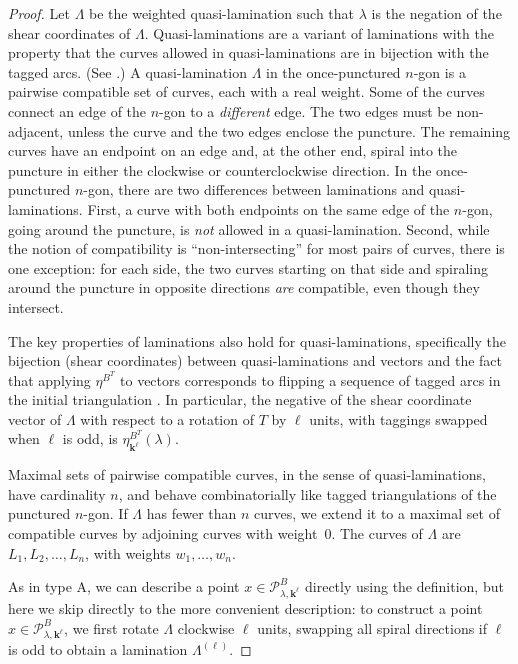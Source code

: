 \documentclass{amsart}
\theoremstyle{definition}
\theoremstyle{remark}
\numberwithin{equation}{section}
\newcommand{\0}{{\mathbf{0}}}
\newcommand{\kk}{{\boldsymbol{k}}}
\renewcommand{\P}{\mathcal{P}}
\begin{document}
\begin{proof}
Let $\Lambda$ be the weighted quasi-lamination such that $\lambda$ is the negation of the shear coordinates of $\Lambda$.
Quasi-laminations are a variant of laminations with the property that the curves allowed in quasi-laminations are in bijection with the tagged arcs.
(See \cite[Section~4]{unisurface}.)
A quasi-lamination $\Lambda$ in the once-punctured $n$-gon is a pairwise compatible set of curves, each with a real weight.
Some of the curves connect an edge of the $n$-gon to a \emph{different} edge.
The two edges must be non-adjacent, unless the curve and the two edges enclose the puncture.
The remaining curves have an endpoint on an edge and, at the other end, spiral into the puncture in either the clockwise or counterclockwise direction.
In the once-punctured $n$-gon, there are two differences between laminations and quasi-laminations.
First, a curve with both endpoints on the same edge of the $n$-gon, going around the puncture, is \emph{not} allowed in a quasi-lamination.
Second, while the notion of compatibility is ``non-intersecting'' for most pairs of curves, there is one exception:  
for each side, the two curves starting on that side and spiraling around the puncture in opposite directions \emph{are} compatible, even though they intersect.

The key properties of laminations also hold for quasi-laminations, specifically the bijection (shear coordinates) between quasi-laminations and vectors \cite[Theorem~4.4]{unisurface} and the fact that applying $\eta^{B^T}$ to vectors corresponds to flipping a sequence of tagged arcs in the initial triangulation \cite[Theorem~4.3]{unisurface}.
In particular, the negative of the shear coordinate vector of $\Lambda$ with respect to a rotation of $T$ by $\ell$ units, with taggings swapped when $\ell$ is odd, is $\eta^{B^T}_{\kk^\ell}(\lambda)$.

Maximal sets of pairwise compatible curves, in the sense of quasi-laminations, have cardinality $n$, and behave combinatorially like tagged triangulations of the punctured $n$-gon.
If $\Lambda$ has fewer than $n$ curves, we extend it to a maximal set of compatible curves by adjoining curves with weight~$0$.
The curves of $\Lambda$ are $L_1,L_2,\ldots,L_n$, with weights $w_1,\ldots,w_n$.

As in type A, we can describe a point $x\in\P^B_{\lambda,\kk^\ell}$ directly using the definition,  %
but here we skip directly to the more convenient description:
to construct a point $x\in\P^B_{\lambda,\kk^\ell}$, we first rotate $\Lambda$ clockwise $\ell$ units, swapping all spiral directions if $\ell$ is odd to obtain a lamination $\Lambda^{(\ell)}$.


\end{proof}
\end{document}
